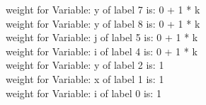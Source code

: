 \begin{example}
                                weight for Variable: y of label 7 is: 0 + 1 * k \\
                                weight for Variable: y of label 8 is: 0 + 1 * k \\
                                weight for Variable: j of label 5 is: 0 + 1 * k \\
                                weight for Variable: i of label 4 is: 0 + 1 * k \\
                                weight for Variable: y of label 2 is: 1 \\
                                weight for Variable: x of label 1 is: 1 \\
                                weight for Variable: i of label 0 is: 1 \\
                                \end{example}